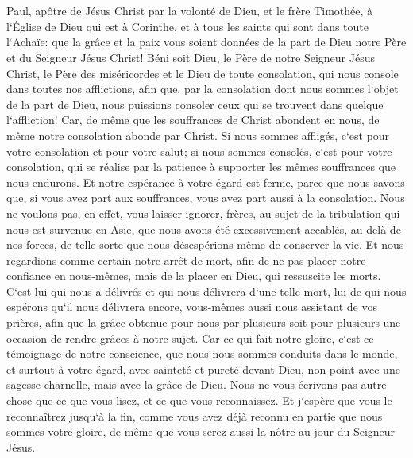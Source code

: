 

\chapter{}

\verse Paul, apôtre de Jésus Christ par la volonté de Dieu, et le frère Timothée, à l`Église de Dieu qui est à Corinthe, et à tous les saints qui sont dans toute l`Achaïe: 
\verse que la grâce et la paix vous soient données de la part de Dieu notre Père et du Seigneur Jésus Christ! 
\verse Béni soit Dieu, le Père de notre Seigneur Jésus Christ, le Père des miséricordes et le Dieu de toute consolation, 
\verse qui nous console dans toutes nos afflictions, afin que, par la consolation dont nous sommes l`objet de la part de Dieu, nous puissions consoler ceux qui se trouvent dans quelque l`affliction! 
\verse Car, de même que les souffrances de Christ abondent en nous, de même notre consolation abonde par Christ. 
\verse Si nous sommes affligés, c`est pour votre consolation et pour votre salut; si nous sommes consolés, c`est pour votre consolation, qui se réalise par la patience à supporter les mêmes souffrances que nous endurons. 
\verse Et notre espérance à votre égard est ferme, parce que nous savons que, si vous avez part aux souffrances, vous avez part aussi à la consolation. 
\verse Nous ne voulons pas, en effet, vous laisser ignorer, frères, au sujet de la tribulation qui nous est survenue en Asie, que nous avons été excessivement accablés, au delà de nos forces, de telle sorte que nous désespérions même de conserver la vie. 
\verse Et nous regardions comme certain notre arrêt de mort, afin de ne pas placer notre confiance en nous-mêmes, mais de la placer en Dieu, qui ressuscite les morts. 
\verse C`est lui qui nous a délivrés et qui nous délivrera d`une telle mort, lui de qui nous espérons qu`il nous délivrera encore, 
\verse vous-mêmes aussi nous assistant de vos prières, afin que la grâce obtenue pour nous par plusieurs soit pour plusieurs une occasion de rendre grâces à notre sujet. 
\verse Car ce qui fait notre gloire, c`est ce témoignage de notre conscience, que nous nous sommes conduits dans le monde, et surtout à votre égard, avec sainteté et pureté devant Dieu, non point avec une sagesse charnelle, mais avec la grâce de Dieu. 
\verse Nous ne vous écrivons pas autre chose que ce que vous lisez, et ce que vous reconnaissez. Et j`espère que vous le reconnaîtrez jusqu`à la fin, 
\verse comme vous avez déjà reconnu en partie que nous sommes votre gloire, de même que vous serez aussi la nôtre au jour du Seigneur Jésus. 
